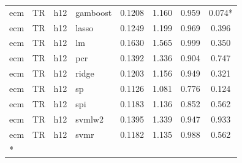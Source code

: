 \begin{ThreePartTable}
\begin{longtable}[t]{llclcccc}
ecm & TR & h12 & gamboost & 0.1208 & 1.160 & 0.959 & 0.074*\\
ecm & TR & h12 & lasso & 0.1249 & 1.199 & 0.969 & 0.396\\
ecm & TR & h12 & lm & 0.1630 & 1.565 & 0.999 & 0.350\\
ecm & TR & h12 & pcr & 0.1392 & 1.336 & 0.904 & 0.747\\
ecm & TR & h12 & ridge & 0.1203 & 1.156 & 0.949 & 0.321\\
ecm & TR & h12 & sp & 0.1126 & 1.081 & 0.776 & 0.124\\
ecm & TR & h12 & spi & 0.1183 & 1.136 & 0.852 & 0.562\\
ecm & TR & h12 & svmlw2 & 0.1395 & 1.339 & 0.947 & 0.933\\
ecm & TR & h12 & svmr & 0.1182 & 1.135 & 0.988 & 0.562\\*
\end{longtable}
\end{ThreePartTable}
\endgroup{}

